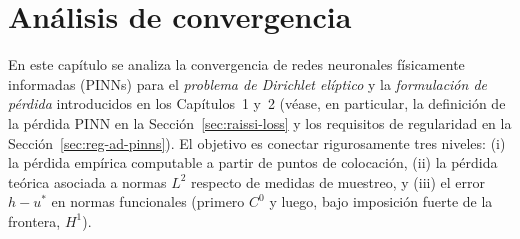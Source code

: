 \chapter{Análisis de convergencia}
\label{chap:convergencia}

\noindent
En este capítulo se analiza la convergencia de redes neuronales físicamente informadas (PINNs) para el
\emph{problema de Dirichlet elíptico} y la \emph{formulación de pérdida} introducidos en los Capítulos~1 y~2
(véase, en particular, la definición de la pérdida PINN en la Sección~\ref{sec:raissi-loss} y los requisitos
de regularidad en la Sección~\ref{sec:reg-ad-pinns}). El objetivo es conectar rigurosamente tres niveles:
(i) la pérdida empírica computable a partir de puntos de colocación, (ii) la pérdida teórica asociada a normas
$L^2$ respecto de medidas de muestreo, y (iii) el error $h-u^*$ en normas funcionales (primero $C^0$ y luego,
bajo imposición fuerte de la frontera, $H^1$).


